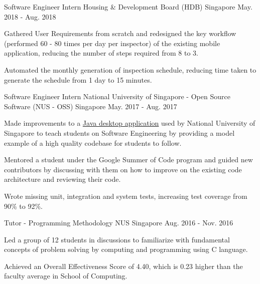 \begin{cventries}
  \cventry
    {Software Engineer Intern} %
    {Housing \& Development Board (HDB)} %
    {Singapore} %
    {May. 2018 - Aug. 2018} %
    {
      \begin{cvitems} %
        \item {Gathered User Requirements from scratch and redesigned the key workflow (performed 60 - 80 times per day per inspector) of the existing mobile application, reducing the number of steps required from 8 to 3.}
        \item {Automated the monthly generation of inspection schedule, reducing time taken to generate the schedule from 1 day to 15 minutes.}
      \end{cvitems}
    }

  \cventry
    {Software Engineer Intern} %
    {National University of Singapore - Open Source Software (NUS - OSS)} %
    {Singapore} %
    {May. 2017 - Aug. 2017} %
    {
      \begin{cvitems} %
        \item {Made improvements to a \href{https://github.com/issues?utf8=\%E2\%9C\%93&q=repo\%3Ase-edu\%2Faddressbook-level4+involves\%3AZhiyuan-Amos}{Java desktop application} used by National University of Singapore to teach students on Software Engineering by providing a model example of a high quality codebase for students to follow.}
        \item {Mentored a student under the Google Summer of Code program and guided new contributors by discussing with them on how to improve on the existing code architecture and reviewing their code.}
        \item {Wrote missing unit, integration and system tests, increasing test coverage from 90\% to 92\%.}
      \end{cvitems}
    }


  \cventry
    {Tutor - Programming Methodology} %
    {NUS} %
    {Singapore} %
    {Aug. 2016 - Nov. 2016} %
    {
      \begin{cvitems} %
        \item {Led a group of 12 students in discussions to familiarize with fundamental concepts of problem solving by computing and programming using C language.}
        \item {Achieved an Overall Effectiveness Score of 4.40, which is 0.23 higher than the faculty average in School of Computing.}
      \end{cvitems}
    }

\end{cventries}
